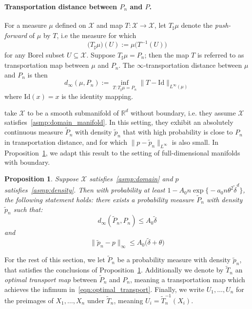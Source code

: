 \documentclass[twoside]{article}
\newcommand{\Reals}{\mathbb{R}}
\newcommand{\1}{\mathbf{1}}
\newcommand{\Rd}{\Reals^d}
\newcommand{\Xset}{\mathcal{X}}
\newcommand{\Leb}{L}
\newcommand{\wt}[1]{\widetilde{#1}}
\newtheorem{proposition}{Proposition}
\theoremstyle{definition}
\theoremstyle{remark}
\begin{document}
\paragraph{Transportation distance between $P_n$ and $P$.}
For a measure $\mu$ defined on $\Xset$ and map $T: \Xset \to \Xset$, let $T_{\sharp}\mu$ denote the \emph{push-forward} of $\mu$ by $T$, i.e the measure for which
\begin{equation*}
\bigl(T_{\sharp}\mu\bigr)(U) := \mu\bigl(T^{-1}(U)\bigr)
\end{equation*}
for any Borel subset $U \subseteq \Xset$. Suppose $T_{\sharp}\mu = P_n$; then the map $T$ is referred to as transportation map between $\mu$ and $P_n$. The  $\infty$-transportation distance between $\mu$ and $P_n$ is then
\begin{equation}
\label{eqn:optimal_transport}
d_{\infty}(\mu,P_n) := \inf_{T: T_{\sharp} \mu = P_n} \|T - \mathrm{Id}\|_{L^{\infty}(\mu)}
\end{equation}
where $\mathrm{Id}(x) = x$ is the identity mapping.

\citet{calder2019} take $\Xset$ to be a smooth submanifold of $\Rd$ without boundary, i.e. they assume $\Xset$ satisfies~\ref{asmp:domain_manifold}. In this setting, they exhibit an absolutely continuous measure $\wt{P}_n$ with density $\wt{p}_n$ that with high probability is close to $P_n$ in transportation distance, and for which $\|p - \wt{p}_n\|_{\Leb^\infty}$ is also small. In Proposition~\ref{prop:optimal_transport}, we adapt this result to the setting of full-dimensional manifolds with boundary.  
\begin{proposition}
	\label{prop:optimal_transport}
	Suppose $\Xset$ satisfies~\ref{asmp:domain} and $p$ satisfies~\ref{asmp:density}. Then with probability at least $1 - A_0 n \exp\bigl\{-a_0 n\theta^2\wt{\delta}^d\bigr\}$, the following statement holds: there exists a probability measure $\wt{P}_n$ with density $\wt{p}_n$ such that:
	\begin{equation}
	\label{eqn:optimal_transport_1}
	d_{\infty}(\wt{P}_n, P_n) \leq A_0 \wt{\delta}
	\end{equation}
	and
	\begin{equation}
	\label{eqn:optimal_transport_2}
	\|\wt{p}_n - p\|_{\infty} \leq A_0\bigl(\wt{\delta} + \theta\bigr)
	\end{equation}
\end{proposition}
For the rest of this section, we let $\wt{P}_n$ be a probability measure with density $\wt{p}_n$, that satisfies the conclusions of Proposition~\ref{prop:optimal_transport}. Additionally we denote by $\wt{T}_n$ an \emph{optimal transport map} between $\wt{P}_n$ and $P_n$, meaning a transportation map which achieves the infimum in~\eqref{eqn:optimal_transport}. Finally, we write $U_1,\ldots,U_n$ for the preimages of $X_1,\ldots,X_n$ under $\wt{T}_n$, meaning $U_i = \wt{T}_n^{-1}(X_i)$. 
\end{document}
